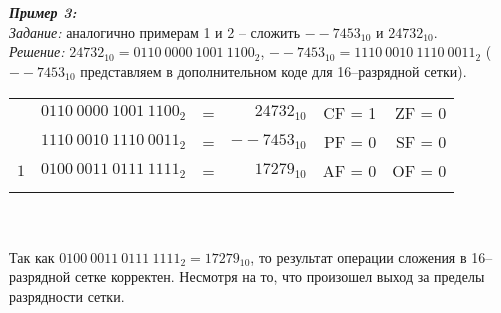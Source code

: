 \\
\\\emph{\textbf{Пример 3:}}
\\\emph{Задание:} аналогично примерам 1 и 2 -- сложить $--7453_{10}$ и $24732_{10}$.
\\\emph{Решение:} $24732_{10} = 0110\ 0000\ 1001\ 1100_{2}$, $--7453_{10} = 1110\ 0010\ 1110\ 0011_{2}$ ($--7453_{10}$ представляем в дополнительном коде для 16--разрядной сетки).
\\
\begin{minipage}[c]{10cm}
\begin{tabular}{r l c r | r r |}
\\
\hhline{~~~~----}
\multirow{2}{*}{+} & $0110\ 0000\ 1001\ 1100_{2}$ & = & $24732_{10}$ & CF = 1 & ZF = 0
\\ & $1110\ 0010\ 1110\ 0011_{2}$ & = & $--7453_{10}$ &  PF = 0 & SF = 0
\\ \hhline{----~~~}
 $1$& $0100\ 0011\ 0111\ 1111_{2}$ & = & $17279_{10}$ & AF = 0 & OF = 0
\\\hhline{~~~~----}
\end{tabular}
\end{minipage}
\\
\\Так как $0100\ 0011\ 0111\ 1111_{2} = 17279_{10}$, то результат операции сложения в 16--разрядной сетке корректен. Несмотря на то, что произошел выход за пределы разрядности сетки.